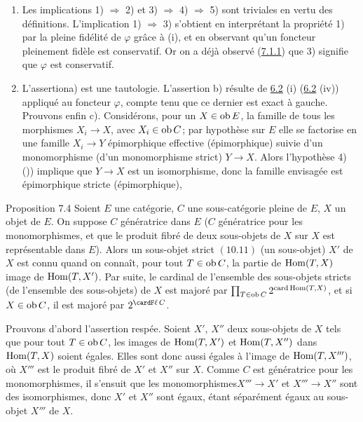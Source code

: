 \documentclass[10pt]{../fichiers-configuration-latex/smfart}
\begin{document}
\begin{enumerate}
\item Les implications 1) $\Rightarrow$ 2) et 3) $\Rightarrow$ 4)
  $\Rightarrow$ 5) sont triviales en vertu des
  définitions. L'implication 1) $\Rightarrow$ 3) s'obtient en
  interprétant la propriété 1) par la pleine fidélité de
  $\varphi$ grâce à (i), et en observant qu'un foncteur pleinement
  fidèle est conservatif. Or on a déjà observé
  (\hyperref[I.sec7.1.1]{7.1.1}) que 3)
  signifie que $\varphi$ est conservatif.

\item L'assertion\pageoriginale a) est une tautologie. L'assertion
  b) résulte de \hyperref[I.prop6.2]{6.2} (i) (\resp  \hyperref[I.prop6.2]{6.2} (iv)) appliqué au foncteur
  $\varphi$, compte tenu que ce dernier est exact à gauche. Prouvons
  enfin c). Considérons, pour un $X\in \operatorname{ob} E$, la famille de tous
  les morphismes $X_i\rightarrow X$, avec $X_i\in \operatorname{ob} C$; par
  hypothèse sur $E$ elle se factorise en une famille $X_i\rightarrow
  Y$ épimorphique effective (\resp  épimorphique) suivie d'un
  monomorphisme (\resp  d'un monomorphisme strict) $Y\rightarrow
  X$. Alors l'hypothèse 4) ()) implique que $Y\rightarrow
  X$ est un isomorphisme, donc la famille envisagée est
  épimorphique stricte (\resp  épimorphique), \cqfd
\end{enumerate}

\begin{enonce*}{Proposition 7.4}
Soient $E$ une catégorie, $C$ une sous-catégorie pleine de $E$, $X$
un objet de $E$. On suppose $C$ génératrice dans $E$ (\resp $C$
génératrice pour les monomorphismes, et que le produit fibré de deux
sous-objets de $X$ sur $X$ est représentable dans $E$). Alors un
sous-objet strict $(10.11)$ (\resp  un sous-objet) $X'$ de $X$ est
connu %
quand on connaît, pour tout $T\in \operatorname{ob} C$, la partie de $\operatorname{Hom}(T,X)$
image de $\operatorname{Hom}(T,X')$. Par suite, le cardinal de l'ensemble des
sous-objets stricts (\resp  de l'ensemble des sous-objets) de $X$
est majoré par $\prod_{T\in \operatorname{ob} C} 2^{\operatorname{card}
  \operatorname{Hom}(T,X)}$, et si $X\in \operatorname{ob} C$, il est majoré par $2^{\card%
F\ell\,C}$.
\end{enonce*}

Prouvons d'abord l'assertion respée. Soient $X'$, $X''$ deux
sous-objets de $X$ tels que pour tout $T\in \operatorname{ob} C$, les images de
$\operatorname{Hom}(T,X')$ et $\operatorname{Hom}(T,X'')$ dans $\operatorname{Hom}(T,X)$ soient égales. Elles
sont donc aussi égales à l'image de $\operatorname{Hom}(T,X''')$, où $X'''$ est le
produit fibré de $X'$ et $X''$ sur $X$. Comme $C$ est génératrice
pour les monomorphismes, il s'ensuit que les
monomorphismes\pageoriginale $X'''\rightarrow X'$ et
$X'''\rightarrow X''$ sont des isomorphismes, donc $X'$ et $X''$
sont égaux, étant séparément égaux au sous-objet $X'''$ de $X$.
\end{document}
